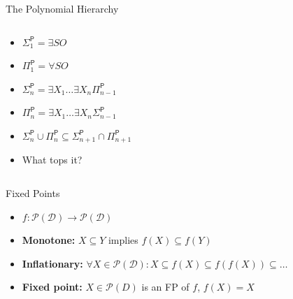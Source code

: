 \documentclass[usenames,dvipsnames]{beamer}
\newcommand{\cD}{\mathcal{D}}
\newcommand{\cP}{\mathcal{P}}
\newcommand{\PTime}{\mathsf{P}}
\begin{document}
\begin{frame}{The Polynomial Hierarchy}
    \begin{columns}
        \begin{column}{0.5\textwidth}
            \begin{itemize}
                \item $\Sigma^\PTime_1 = \exists SO$
                \item $\Pi^\PTime_1 = \forall SO$
                \item $\Sigma^\PTime_n = \exists X_1\ldots\exists X_n\Pi^\PTime_{n-1}$
                \item $\Pi^\PTime_n = \exists X_1\ldots\exists X_n\Sigma^\PTime_{n-1}$
                \item $\Sigma^\PTime_n\cup\Pi^\PTime_n\subseteq\Sigma^\PTime_{n+1}\cap\Pi^\PTime_{n+1}$
                \item What tops it? 
            \end{itemize}
        \end{column}
        \begin{column}{0.5\textwidth}
        \end{column}
    \end{columns}
\end{frame}

\begin{frame}{Fixed Points}
    \begin{itemize}
        \item $f:\cP(\cD)\rightarrow\cP(\cD)$
        \item \textbf{Monotone:} $X\subseteq Y$ implies $f(X)\subseteq f(Y)$
        \item \textbf{Inflationary:} $\forall X\in\cP(\cD): X\subseteq f(X)\subseteq f(f(X))\subseteq\ldots$
        \item \textbf{Fixed point:} $X\in\cP(D)$ is an FP of $f$, $f(X) = X$
    \end{itemize}
\end{frame}
\end{document}
